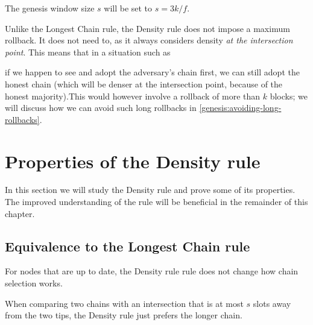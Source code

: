 \begin{definition}
The genesis window size $s$ will be set to $s = 3k/f$.
\end{definition}

Unlike the Longest Chain rule, the Density rule does not impose a maximum
rollback. It does not need to, as it always considers density \emph{at the
intersection point}. This means that in a situation such as
%
\begin{center}
\end{center}
%
if we happen to see and adopt the adversary's chain first, we can still adopt
the honest chain (which will be denser at the intersection point, because of the
honest majority).This would however involve a rollback of more than $k$ blocks;
we will discuss how we can avoid such long rollbacks in
\cref{genesis:avoiding-long-rollbacks}.

\section{Properties of the Density rule}

In this section we will study the Density rule and prove some of its
properties. The improved understanding of the rule will be beneficial in the
remainder of this chapter.

\subsection{Equivalence to the Longest Chain rule}

For nodes that are up to date, the Density rule rule does not change how chain
selection works.

\begin{lemma}
\label{lemma:tip-density-is-chain-length}
When comparing two chains with an intersection that is at most $s$ slots away
from the two tips, the Density rule just prefers the longer chain.
\end{lemma}

